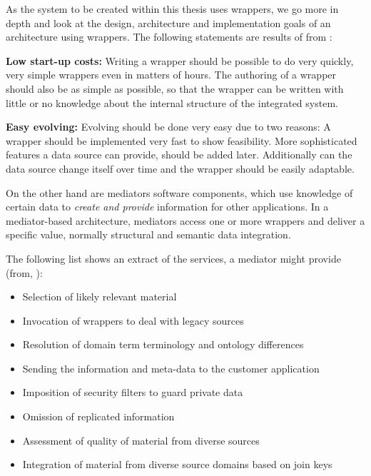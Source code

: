 As the system to be created within this thesis uses wrappers, we go more in depth and look at the design, architecture and implementation goals of an architecture using wrappers. The following statements are results of from \cite{Roth:1997:DSW:645923.670992}:


\textbf{Low start-up costs:} Writing a wrapper should be possible to do very quickly, very simple wrappers even in matters of hours. The authoring of a wrapper should also be as simple as possible, so that the wrapper can be written with little or no knowledge about the internal structure of the integrated system.

\textbf{Easy evolving:} Evolving should be done very easy due to two reasons: A wrapper should be implemented very fast to show feasibility. More sophisticated features a data source can provide, should be added later. Additionally can the data source change  itself over time and the wrapper should be easily adaptable. 


On the other hand are mediators software components, which use knowledge of certain data to \textit{create and provide} information for other applications. In a mediator-based architecture, mediators access one or more wrappers and deliver a specific value, normally structural and semantic data integration.

The following list shows an extract of the services, a mediator might provide (from, \cite[p. 5-6]{Wiederhold1996TheCB}): 
\begin{itemize}
\item Selection of likely relevant material
\item Invocation of wrappers to deal with legacy sources
\item Resolution of domain term	terminology and ontology differences
\item Sending the information and meta-data to the customer application
\item Imposition of security filters to guard private data
\item Omission of replicated information
\item Assessment of quality of material from diverse sources
\item Integration of material from diverse source domains based on join keys
\end{itemize}


